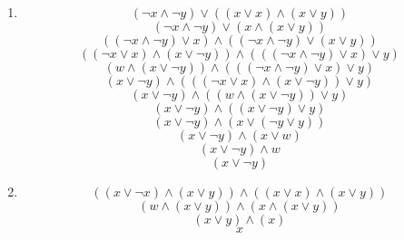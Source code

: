 \documentclass[a4paper]{article}
\begin{document}
\begin{enumerate}
\begin{enumerate}
			\item
			\begin{equation*}
				(\lnot x \land \lnot y) \lor ((x \lor x) \land (x \lor y))
			\end{equation*}
			\begin{equation*}
				(\lnot x \land \lnot y) \lor (x \land (x \lor y))
			\end{equation*}
			\begin{equation*}
				((\lnot x \land \lnot y) \lor x) \land ((\lnot x \land \lnot y) \lor (x \lor y))
			\end{equation*}
			\begin{equation*}
				((\lnot x \lor x) \land (x \lor \lnot y)) \land (((\lnot x \land \lnot y) \lor x) \lor y)
			\end{equation*}
			\begin{equation*}
				(w \land (x \lor \lnot y)) \land (((\lnot x \land \lnot y) \lor x) \lor y)
			\end{equation*}
			\begin{equation*}
				(x \lor \lnot y) \land (((\lnot x \lor x) \land (x \lor \lnot y)) \lor y)
			\end{equation*}
			\begin{equation*}
				(x \lor \lnot y) \land ((w \land (x \lor \lnot y)) \lor y)
			\end{equation*}
			\begin{equation*}
				(x \lor \lnot y) \land ((x \lor \lnot y) \lor y)
			\end{equation*}
			\begin{equation*}
				(x \lor \lnot y) \land (x \lor (\lnot y \lor y))
			\end{equation*}
			\begin{equation*}
				(x \lor \lnot y) \land (x \lor w)
			\end{equation*}
			\begin{equation*}
				(x \lor \lnot y) \land w
			\end{equation*}
			\begin{equation*}
				(x \lor \lnot y)
			\end{equation*}
			
			\item
			\begin{equation*}
				((x \lor \lnot x) \land (x \lor y)) \land ((x \lor x) \land (x \lor y))
			\end{equation*}
			\begin{equation*}
				(w \land (x \lor y)) \land (x \land (x \lor y))
			\end{equation*}
			\begin{equation*}
				(x \lor y) \land (x)
			\end{equation*}
			\begin{equation*}
				x
			\end{equation*}
		\end{enumerate}
		

\end{enumerate}
\end{document}
